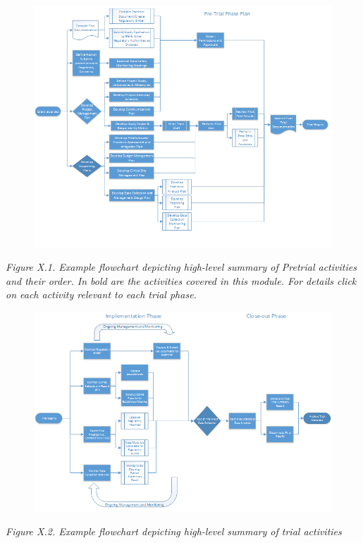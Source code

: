 \documentclass[]{book}
\begin{document}
\begin{figure}[htbp]
\centering
\includegraphics{images/book/pm2.png}
\caption{}
\end{figure}

\emph{Figure X.1. Example flowchart depicting high-level summary of
Pretrial activities and their order. In bold are the activities covered
in this module. For details click on each activity relevant to each
trial phase. }

\begin{figure}[htbp]
\centering
\includegraphics{images/book/pm3.png}
\caption{}
\end{figure}

\emph{Figure X.2. Example flowchart depicting high-level summary of
trial activities }
\end{document}
